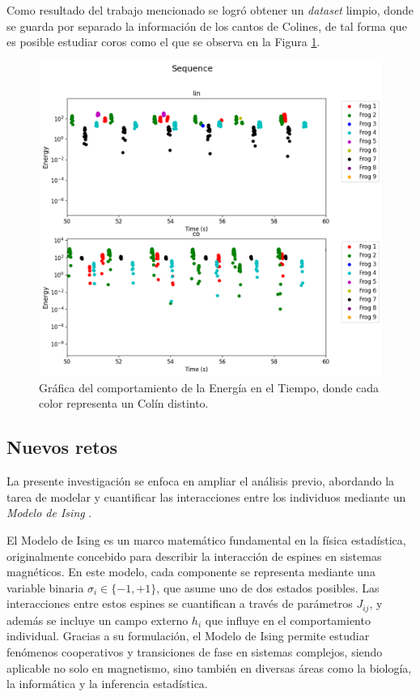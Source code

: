 \documentclass[a4paper,10pt,twocolumn]{article}
\begin{document}
Como resultado del trabajo mencionado se logró obtener un \textit{dataset}
limpio, donde se guarda por separado la información de los cantos de
Colines, de tal forma que es posible estudiar coros como el que se observa 
en la Figura \ref{fig:seq}.

\begin{figure}[htbp]
    \centering
    \includegraphics[width=\columnwidth]{assets/sequence.png}
    \caption{Gráfica del comportamiento de la Energía en el Tiempo, donde cada color representa un Colín distinto.}
    \label{fig:seq}
\end{figure}

\subsection{Nuevos retos}

La presente investigación se enfoca en ampliar el análisis 
previo, abordando la tarea de modelar y cuantificar las 
interacciones entre los individuos mediante un 
\emph{Modelo de Ising} \cite{chau2017inverse}. 

El Modelo de Ising es un marco matemático fundamental en la física estadística, originalmente concebido para describir la interacción de espines en sistemas magnéticos. En este modelo, cada componente se representa mediante una variable binaria \( \sigma_i \in \{-1,+1\} \), que asume uno de dos estados posibles. Las interacciones entre estos espines se cuantifican a través de parámetros \( J_{ij} \), y además se incluye un campo externo \( h_i \) que influye en el comportamiento individual. Gracias a su formulación, el Modelo de Ising permite estudiar fenómenos cooperativos y transiciones de fase en sistemas complejos, siendo aplicable no solo en magnetismo, sino también en diversas áreas como la biología, la informática y la inferencia estadística.
\end{document}
